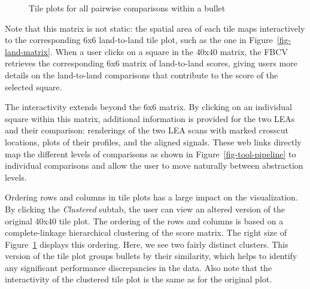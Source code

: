 \documentclass[
  12pt]{article}
\begin{document}
\begin{figure}[H]


\caption{\label{fig-tilePlots}Tile plots for all pairwise comparisons
within a bullet}

\end{figure}%

Note that this matrix is not static: the spatial area of each tile maps
interactively to the corresponding 6x6 land-to-land tile plot, such as
the one in Figure~\ref{fig-land-matrix}. When a user clicks on a square
in the 40x40 matrix, the FBCV retrieves the corresponding 6x6 matrix of
land-to-land scores, giving users more details on the land-to-land
comparisons that contribute to the score of the selected square.

The interactivity extends beyond the 6x6 matrix. By clicking on an
individual square within this matrix, additional information is provided
for the two LEAs and their comparison: renderings of the two LEA scans
with marked crosscut locations, plots of their profiles, and the aligned
signals. These web links directly map the different levels of
comparisons as shown in Figure~\ref{fig-tool-pipeline} to individual
comparisons and allow the user to move naturally between abstraction
levels.

Ordering rows and columns in tile plots has a large impact on the
visualization. By clicking the \emph{Clustered} subtab, the user can
view an altered version of the original 40x40 tile plot. The ordering of
the rows and columns is based on a complete-linkage hierarchical
clustering of the score matrix. The right size of
Figure~\ref{fig-tilePlots} displays this ordering. Here, we see two
fairly distinct clusters. This version of the tile plot groups bullets
by their similarity, which helps to identify any significant performance
discrepancies in the data. Also note that the interactivity of the
clustered tile plot is the same as for the original plot.
\end{document}
